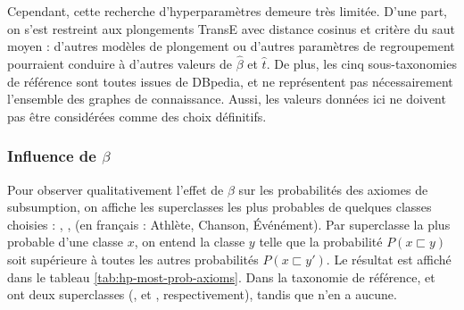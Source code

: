 Cependant, cette recherche d'hyperparamètres demeure très limitée. D'une part, on s'est restreint aux plongements TransE avec distance cosinus et critère du saut moyen : d'autres modèles de plongement ou d'autres paramètres de regroupement pourraient conduire à d'autres valeurs de $\hat{\beta}$ et $\hat{t}$. De plus, les cinq sous-taxonomies de référence sont toutes issues de DBpedia, et ne représentent pas nécessairement l'ensemble des graphes de connaissance. Aussi, les valeurs données ici ne doivent pas être considérées comme des choix définitifs.



\subsubsection{Influence de \texorpdfstring{$\beta$}{beta}}
\label{subsec:te-hp-beta}

Pour observer qualitativement l'effet de $\beta$ sur les probabilités des axiomes de subsumption, on affiche les superclasses les plus probables de quelques classes choisies : , ,  (en français : Athlète, Chanson, Événément). Par superclasse la plus probable d'une classe $x$, on entend la classe $y$ telle que la probabilité $P(x \sqsubset y)$ soit supérieure à toutes les autres probabilités $P(x \sqsubset y')$. Le résultat est affiché dans le tableau \ref{tab:hp-most-prob-axioms}. Dans la taxonomie de référence,  et  ont deux superclasses (,  et ,  respectivement), tandis que  n'en a aucune.


